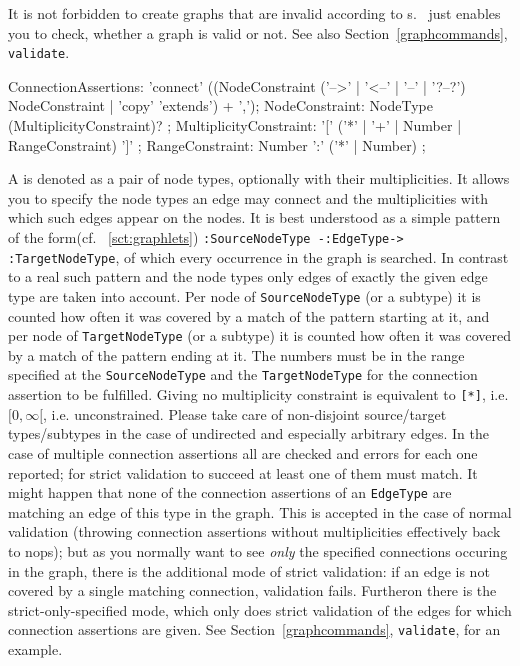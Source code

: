 \begin{warning}
It is not forbidden to create graphs that are invalid according to s.
\GrG\ just enables you to check, whether a graph is valid or not.
See also Section~\ref{graphcommands}, \texttt{validate}.
\end{warning}

\begin{rail}
  ConnectionAssertions: 'connect' ((NodeConstraint ('-->' | '<--' | '--' | '?--?') NodeConstraint | 'copy' 'extends') + ',');
  NodeConstraint: NodeType (MultiplicityConstraint)? ;
  MultiplicityConstraint: '[' ('*' | '+' | Number | RangeConstraint) ']' ;
  RangeConstraint: Number ':' ('*' | Number) ;
\end{rail}\label{sct:ConnectionAssertions}
A \emph{} is denoted as a pair of node types, optionally with their multiplicities.
It allows you to specify the node types an edge may connect and the multiplicities with which such edges appear on the nodes.
It is best understood as a simple pattern of the form(cf. ~\ref{sct:graphlets}) \texttt{:SourceNodeType -:EdgeType-> :TargetNodeType}, of which every occurrence in the graph is searched.
In contrast to a real such pattern and the node types only edges of exactly the given edge type are taken into account.
Per node of \texttt{SourceNodeType} (or a subtype) it is counted how often it was covered by a match of the pattern starting at it,
and per node of \texttt{TargetNodeType} (or a subtype) it is counted how often it was covered by a match of the pattern ending at it.
The numbers must be in the range specified at the \texttt{SourceNodeType} and the \texttt{TargetNodeType} for the connection assertion to be fulfilled.
Giving no multiplicity constraint is equivalent to \verb#[*]#, i.e. $[0,\infty[$, i.e. unconstrained.
Please take care of non-disjoint source/target types/subtypes in the case of undirected and especially arbitrary edges.
In the case of multiple connection assertions all are checked and errors for each one reported; for strict validation to succeed at least one of them must match.
It might happen that none of the connection assertions of an \texttt{EdgeType} are matching an edge of this type in the graph.
This is accepted in the case of normal validation (throwing connection assertions without multiplicities effectively back to nops);
but as you normally want to see \emph{only} the specified connections occuring in the graph,
there is the additional mode of strict validation: if an edge is not covered by a single matching connection, validation fails.
Furtheron there is the strict-only-specified mode, which only does strict validation of the edges for which connection assertions are given.
See Section~\ref{graphcommands}, \texttt{validate}, for an example.

